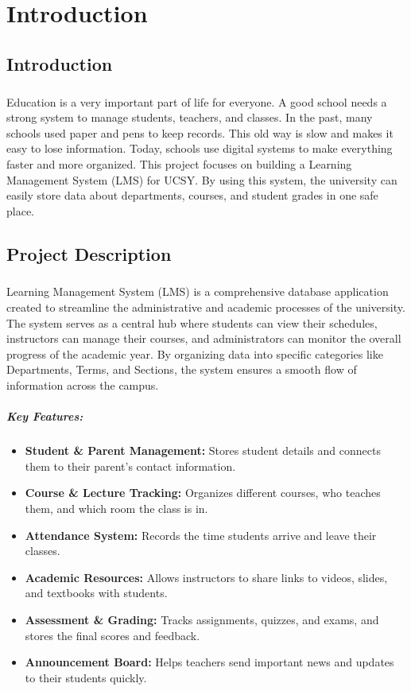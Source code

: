 \documentclass[12pt,a4paper]{report}
\begin{document}
\chapter{Introduction}
\section{Introduction}
\paragraph{}
\indent Education is a very important part of life for everyone. A good school needs a strong system to manage students, teachers, and classes. In the past, many schools used paper and pens to keep records. This old way is slow and makes it easy to lose information. Today, schools use digital systems to make everything faster and more organized. This project focuses on building a Learning Management System (LMS) for UCSY. By using this system, the university can easily store data about departments, courses, and student grades in one safe place.
\section{Project Description}
\paragraph{}
\indent Learning Management System (LMS) is a comprehensive database application created to streamline the administrative and academic processes of the university. The system serves as a central hub where students can view their schedules, instructors can manage their courses, and administrators can monitor the overall progress of the academic year. By organizing data into specific categories like Departments, Terms, and Sections, the system ensures a smooth flow of information across the campus.
\paragraph{\textbf{Key Features:}}
\begin{itemize}[noitemsep]
    \item \textbf{Student \& Parent Management:} Stores student details and connects them to their parent's contact information.
    \item \textbf{Course \& Lecture Tracking:} Organizes different courses, who teaches them, and which room the class is in.
    \item \textbf{Attendance System:} Records the time students arrive and leave their classes.
    \item \textbf{Academic Resources:} Allows instructors to share links to videos, slides, and textbooks with students.
    \item \textbf{Assessment \& Grading:} Tracks assignments, quizzes, and exams, and stores the final scores and feedback.
    \item \textbf{Announcement Board:} Helps teachers send important news and updates to their students quickly.
\end{itemize}
\end{document}
